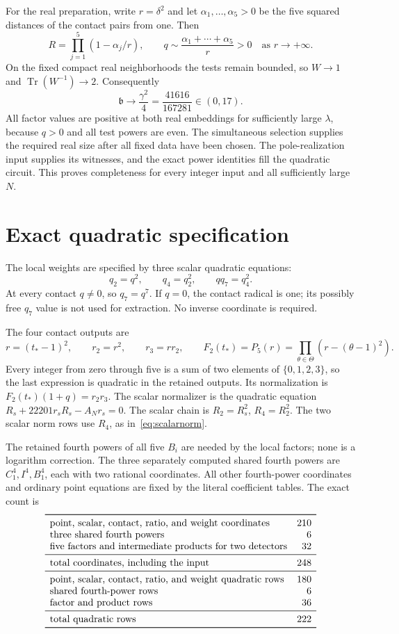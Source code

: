 \documentclass[11pt,a4paper]{article}
\DeclareMathOperator{\Tr}{Tr}\DeclareMathOperator{\Nm}{Nm}
\begin{document}
For the real preparation, write $r=\delta^2$ and let
$\alpha_1,\ldots,\alpha_5>0$ be the five squared distances of the
contact pairs from one. Then
\[
 R=\prod_{j=1}^{5}(1-\alpha_j/r),\qquad
 q\sim\frac{\alpha_1+\cdots+\alpha_5}r>0
 \quad\text{as }r\longrightarrow+\infty.
\]
On the fixed compact real neighborhoods the tests remain bounded, so
$W\to1$ and $\Tr(W^{-1})\to2$. Consequently
\[
              \mathfrak b\longrightarrow\frac{\gamma^2}{4}
                              =\frac{41616}{167281}\in(0,17).
\]
All factor values are positive at both real embeddings for sufficiently
large $\lambda$, because $q>0$ and all test powers are even.
The simultaneous selection supplies the required real size after all
fixed data have been chosen. The pole-realization input supplies its
witnesses, and the exact power identities fill the quadratic circuit.
This proves completeness for every integer input and all sufficiently large $N$.

\section{Exact quadratic specification}
The local weights are specified by three scalar quadratic equations:
\[
                     q_2=q^2,\qquad q_4=q_2^2,\qquad qq_7=q_4^2.
\]
At every contact $q\ne0$, so $q_7=q^7$. If $q=0$, the contact
radical is one; its possibly free $q_7$ value is not used for extraction.
No inverse coordinate is required.

The four contact outputs are
\[
 r=(t_*-1)^2,\qquad r_2=r^2,\qquad r_3=rr_2,\qquad
 F_2(t_*)=P_5(r)=\prod_{\theta\in\Theta}(r-(\theta-1)^2).
\]
Every integer from zero through five is a sum of two elements of
$\{0,1,2,3\}$, so the last expression is quadratic in the retained
outputs. Its normalization is $F_2(t_*)(1+q)=r_2r_3$.
The scalar normalizer is the quadratic equation
$R_s+22201r_sR_s-A_Nr_s=0$.
The scalar chain is $R_2=R_s^2$, $R_4=R_2^2$.
The two scalar norm rows use $R_4$, as in~\eqref{eq:scalarnorm}.

The retained fourth powers of all five $B_i$ are needed by the
local factors; none is a logarithm correction. The three separately
computed shared fourth powers are $C_1^4,I^4,B_1^4$, each with two
rational coordinates. All other fourth-power coordinates and ordinary
point equations are fixed by the literal coefficient tables.
The exact count is
\[
\begin{array}{lr}\toprule
\text{point, scalar, contact, ratio, and weight coordinates}&210\\
\text{three shared fourth powers}&6\\
\text{five factors and intermediate products for two detectors}&32\\\midrule
\text{total coordinates, including the input}&248\\\midrule
\text{point, scalar, contact, ratio, and weight quadratic rows}&180\\
\text{shared fourth-power rows}&6\\
\text{factor and product rows}&36\\\midrule
\text{total quadratic rows}&222\\\bottomrule
\end{array}
\]
\end{document}

